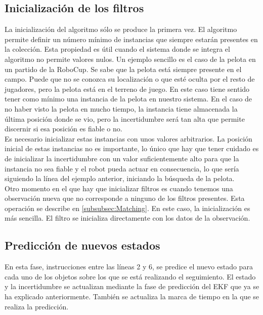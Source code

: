 \subsection{Inicialización de los filtros}
\label{subsec:inicializacion}

La inicialización del algoritmo sólo se produce la primera vez. El algoritmo permite definir un número mínimo de instancias que siempre estarán presentes en la colección. Esta propiedad es útil cuando el sistema donde se integra el algoritmo no permite valores nulos. Un ejemplo sencillo es el caso de la pelota en un partido de la RoboCup. Se sabe que la pelota está siempre presente en el campo. Puede que no se conozca su localización o que esté oculta por el resto de jugadores, pero la pelota está en el terreno de juego. En este caso tiene sentido tener como mínimo una instancia de la pelota en nuestro sistema. En el caso de no haber visto la pelota en mucho tiempo, la instancia tiene almacenada la última posición donde se vio, pero la incertidumbre será tan alta que permite discernir si esa posición es fiable o no.\\

Es necesario inicializar estas instancias con unos valores arbitrarios. La posición inicial de estas instancias no es importante, lo único que hay que tener cuidado es de inicializar la incertidumbre con un valor suficientemente alto para que la instancia no sea fiable y el robot pueda actuar en consecuencia, lo que sería siguiendo la línea del ejemplo anterior, iniciando la búsqueda de la pelota. \\

Otro momento en el que hay que inicializar filtros es cuando tenemos una observación nueva que no corresponde a ninguno de los filtros presentes. Esta operación se describe en \ref{subsubsec:Matching}. En este caso, la inicialización es más sencilla. El filtro se inicializa directamente con los datos de la observación.

\subsection{Predicción de nuevos estados}
\label{subsec:prediccionnuevosestados}

En esta fase, instrucciones entre las líneas 2 y 6, se predice el nuevo estado para cada uno de los objetos sobre los que se está realizando el seguimiento. El estado y la incertidumbre se actualizan mediante la fase de predicción del EKF que ya se ha explicado anteriormente. También se actualiza la marca de tiempo en la que se realiza la predicción.\\

